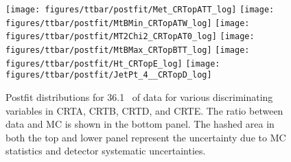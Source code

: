 \begin{figure}[htbp]
  \begin{center}
    \texttt{[image: figures/ttbar/postfit/Met\_CRTopATT\_log]} 
    \texttt{[image: figures/ttbar/postfit/MtBMin\_CRTopATW\_log]} 
     \texttt{[image: figures/ttbar/postfit/MT2Chi2\_CRTopAT0\_log]}    
      \texttt{[image: figures/ttbar/postfit/MtBMax\_CRTopBTT\_log]} 
    \texttt{[image: figures/ttbar/postfit/Ht\_CRTopE\_log]} 
    \texttt{[image: figures/ttbar/postfit/JetPt\_4\_\_CRTopD\_log]} 
  \end{center}
  \caption[Postfit distributions of several discriminating variables in CRT]{Postfit distributions for 36.1 \ifb\ of data for various discriminating variables in CRTA, CRTB, CRTD, and CRTE.  The ratio between data and MC is shown in the bottom panel. The hashed area in both the top and lower panel represent the uncertainty due to MC statistics and detector systematic uncertainties.}
  \label{fig:CRT}
\end{figure}
\clearpage



